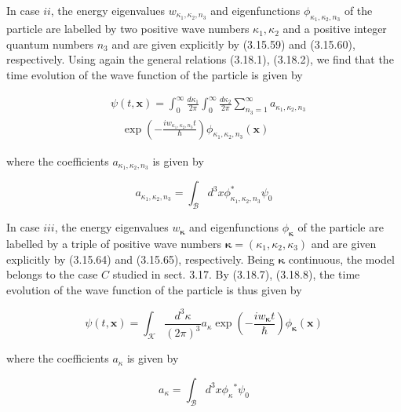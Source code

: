 \documentclass{article}
\begin{document}
In case $i i$, the energy eigenvalues $w_{\kappa_{1}, \kappa_{2}, n_{3}}$ and eigenfunctions $\phi_{\kappa_{1}, \kappa_{2}, n_{3}}$ of the particle are labelled by two positive wave numbers $\kappa_{1}, \kappa_{2}$ and a positive integer quantum numbers $n_{3}$ and are given explicitly by (3.15.59) and (3.15.60), respectively. Using again the general relations (3.18.1), (3.18.2), we find that the time evolution of the wave function of the particle is given by
 
\begin{align*}
& \psi(t, \boldsymbol{x})=\int_{0}^{\infty} \frac{d \kappa_{1}}{2 \pi} \int_{0}^{\infty} \frac{d \kappa_{2}}{2 \pi} \sum_{n_{3}=1}^{\infty} a_{\kappa_{1}, \kappa_{2}, n_{3}}  \tag{3.19.6}\\
& \quad \exp \left(-\frac{i w_{\kappa_{1}, \kappa_{2}, n_{3}} t}{\hbar}\right) \phi_{\kappa_{1}, \kappa_{2}, n_{3}}(\boldsymbol{x})
\end{align*}
 
where the coefficients $a_{\kappa_{1}, \kappa_{2}, n_{3}}$ is given by
 
\begin{equation*}
a_{\kappa_{1}, \kappa_{2}, n_{3}}=\int_{\mathcal{B}} d^{3} x \phi_{\kappa_{1}, \kappa_{2}, n_{3}}^{*} \psi_{0} \tag{3.19.7}
\end{equation*}
 

In case $i i i$, the energy eigenvalues $w_{\boldsymbol{\kappa}}$ and eigenfunctions $\phi_{\boldsymbol{\kappa}}$ of the particle are labelled by a triple of positive wave numbers $\boldsymbol{\kappa}=\left(\kappa_{1}, \kappa_{2}, \kappa_{3}\right)$ and are given explicitly by (3.15.64) and (3.15.65), respectively. Being $\boldsymbol{\kappa}$ continuous, the model belongs to the case $C$ studied in sect. 3.17. By (3.18.7), (3.18.8), the time evolution of the wave function of the particle is thus given by
 
\begin{equation*}
\psi(t, \boldsymbol{x})=\int_{\mathcal{K}} \frac{d^{3} \kappa}{(2 \pi)^{3}} a_{\kappa} \exp \left(-\frac{i w_{\boldsymbol{\kappa}} t}{\hbar}\right) \phi_{\boldsymbol{\kappa}}(\boldsymbol{x}) \tag{3.19.8}
\end{equation*}
 
where the coefficients $a_{\kappa}$ is given by
 
\begin{equation*}
a_{\kappa}=\int_{\mathcal{B}} d^{3} x \phi_{\kappa}{ }^{*} \psi_{0} \tag{3.19.9}
\end{equation*}
 
\end{document}
